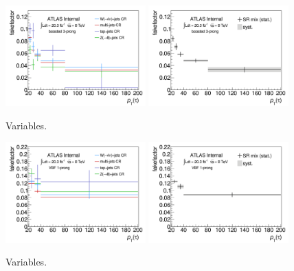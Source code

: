 \begin{figure}[tp]
  \centering
  \includegraphics[width=0.48\textwidth]{figures/backgrounds/fakefactor_8TeV_boosted_3p_CRs}
  \includegraphics[width=0.48\textwidth]{figures/backgrounds/fakefactor_8TeV_boosted_3p_mix}
  \caption{Variables.}
  \label{fig:backgrounds-fakefactorsboost3p}
\end{figure}

\begin{figure}[tp]
  \centering
  \includegraphics[width=0.48\textwidth]{figures/backgrounds/fakefactor_8TeV_vbf_1p_CRs}
  \includegraphics[width=0.48\textwidth]{figures/backgrounds/fakefactor_8TeV_vbf_1p_mix}
  \caption{Variables.}
  \label{fig:backgrounds-fakefactorsVBF1p}
\end{figure}

